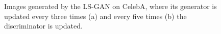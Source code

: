 \begin{figure}[t]
\centering
{}%
   \caption{Images generated by the LS-GAN on CelebA, where its generator is updated every three times (a) and every five times (b) the discriminator is updated.}\label{fig:freq_gen}
\end{figure}



